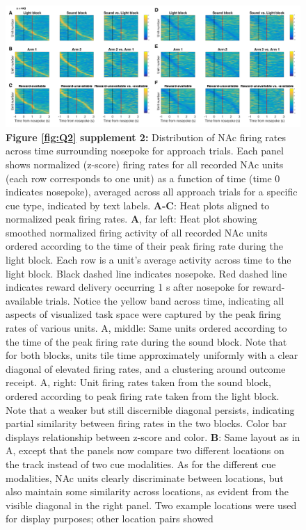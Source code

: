 \documentclass[11pt]{article}
\newcommand{\bsf}[1]{\textbf{#1}}
\begin{document}
 \begin{figure}[ht!]
\centering
\includegraphics[width=\textwidth]{Fig 7 - SUPP NP Task tiling.pdf}
\caption*{\bsf{Figure \ref{fig:Q2} supplement 2:} Distribution of NAc firing rates across time surrounding nosepoke for approach
trials. Each panel shows normalized (z-score) firing rates for all recorded NAc units
(each row corresponds to one unit) as a function of time (time 0 indicates
nosepoke), averaged across all approach trials for a specific cue type,
indicated by text labels. \bsf{A-C}: Heat plots aligned to normalized peak firing rates. \bsf{A}, far left: Heat plot showing smoothed
normalized firing activity of all recorded NAc units ordered according to the
time of their peak firing rate during the light block. Each row is a unit’s
average activity across time to the light block. Black dashed line indicates
nosepoke. Red dashed line indicates reward delivery occurring 1 s after
nosepoke for reward-available trials. Notice the yellow band across time,
indicating all aspects of visualized task space were captured by the peak
firing rates of various units. A, middle: Same units ordered according to
the time of the peak firing rate during the sound block. Note that for both
blocks, units tile time approximately uniformly with a clear diagonal of
elevated firing rates, and a clustering around outcome receipt. A, right: Unit firing rates taken from the sound block, ordered according to peak
firing rate taken from the light block. Note that a weaker but still
discernible diagonal persists, indicating partial similarity between firing
rates in the two blocks. Color bar displays relationship between z-score and color. \bsf{B}: Same layout as in A, except
that the panels now compare two different locations on the track instead of
two cue modalities. As for the different cue modalities, NAc units clearly
discriminate between locations, but also maintain some similarity across
locations, as evident from the visible diagonal in the right panel. Two
example locations were used for display purposes; other location pairs showed
}
\end{figure}
\end{document}
